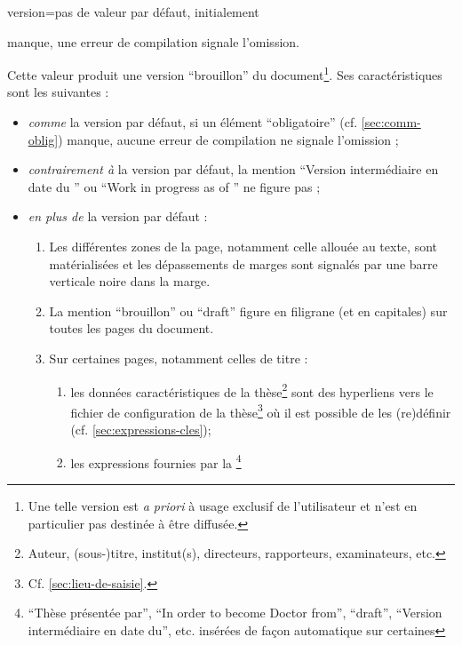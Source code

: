 {\begin{docKey}{version}{=\textbar{}\textbar{}\textbar{}}{pas
      de valeur par défaut, initialement }
\begin{description}
\begin{enumerate}
        manque, une erreur de compilation signale l'omission.
      \end{enumerate}
    \item[\docValue{draft}.] Cette valeur produit une version
      \enquote{brouillon} du document\footnote{Une telle version est \emph{a
          priori} à usage exclusif de l'utilisateur et n'est en particulier pas
        destinée à être diffusée.}. Ses caractéristiques sont les suivantes :
      \begin{itemize}
      \item \emph{comme} la version par défaut, si un élément \enquote{obligatoire}
        (cf. \vref{sec:comm-oblig}) manque, aucune erreur de compilation ne
        signale l'omission ;
      \item \emph{contrairement à} la version par défaut, la mention \enquote{Version
          intermédiaire en date du } ou \foreignquote{english}{Work
          in progress as of } ne figure pas ;
      \item \emph{en plus de} la version par défaut :
        \begin{enumerate}
        \item Les différentes zones de la page, notamment celle allouée au
          texte, sont matérialisées et les dépassements de marges sont signalés
          par une barre verticale noire dans la marge.
        \item La mention \enquote{brouillon} ou
          \foreignquote{english}{draft}\selonlangue{} figure en filigrane (et
          en capitales) sur toutes les pages du document.
        \item Sur certaines pages, notamment celles de titre :
          \begin{enumerate}
          \item les données caractéristiques de la thèse\footnote{Auteur,
              (sous-)titre, institut(s), directeurs, rapporteurs, examinateurs,
              etc.} sont des hyperliens vers le fichier de configuration de la
            thèse\footnote{Cf. \vref{sec:lieu-de-saisie}.} où il est possible
            de les (re)définir (cf. \vref{sec:expressions-cles});
          \item\label{item-expression} les expressions fournies par la
            \yatcl\footnote{\enquote{Thèse présentée par},
              \foreignquote{english}{In order to become Doctor from},
              \foreignquote{english}{draft}, \enquote{Version intermédiaire en
                date du}, etc. insérées de façon automatique sur certaines
}
\end{enumerate}
\end{enumerate}
\end{itemize}
\end{description}
\end{docKey}}
